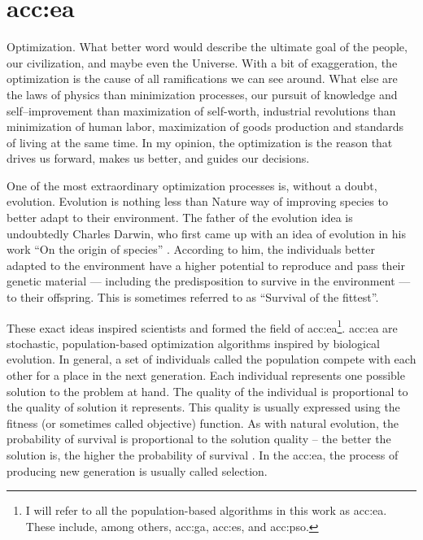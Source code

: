 \chapter{\texorpdfstring{\acrlong*{acc:ea}}{Evolutionary Algorithms}}
\label{chap:eva}

Optimization. What better word would describe the ultimate goal of the people, our civilization, and maybe even the Universe. With a bit of exaggeration, the optimization is the cause of all ramifications we can see around. What else are the laws of physics than minimization processes, our pursuit of knowledge and self--improvement than maximization of self-worth, industrial revolutions than minimization of human labor, maximization of goods production and standards of living at the same time. In my opinion, the optimization is the reason that drives us forward, makes us better, and guides our decisions.

One of the most extraordinary optimization processes is, without a doubt, evolution. Evolution is nothing less than Nature way of improving species to better adapt to their environment. The father of the evolution idea is undoubtedly Charles Darwin, who first came up with an idea of evolution in his work \enquote{On the origin of species} \citep{darwinOriginal}. According to him, the individuals better adapted to the environment have a higher potential to reproduce and pass their genetic material --- including the predisposition to survive in the environment --- to their offspring. This is sometimes referred to as \enquote{Survival of the fittest}.

These exact ideas inspired scientists and formed the field of \acrfull{acc:ea}\footnote{I will refer to all the population-based algorithms in this work as \acrlong*{acc:ea}. These include, among others, \acrlong*{acc:ga}, \acrlong*{acc:es}, and \acrlong*{acc:pso}.}.
\acrshort{acc:ea} are stochastic, population-based optimization algorithms inspired by biological evolution. In general, a set of individuals called the population compete with each other for a place in the next generation. Each individual represents one possible solution to the problem at hand. The quality of the individual is proportional to the quality of solution it represents. This quality is usually expressed using the fitness (or sometimes called objective) function. As with natural evolution, the probability of survival is proportional to the solution quality -- the better the solution is, the higher the probability of survival \citep{IntroductionToEA}. In the \acrshort{acc:ea}, the process of producing new generation is usually called selection.

